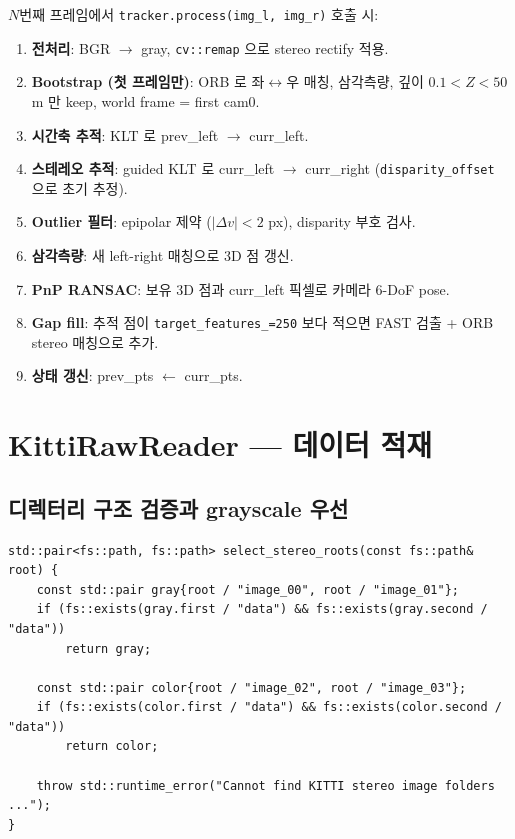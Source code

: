 \documentclass[11pt,a4paper,oneside]{report}
\begin{document}
\(N\)번째 프레임에서 \texttt{tracker.process(img\_l, img\_r)} 호출 시:

\begin{enumerate}
\item \textbf{전처리}: BGR \(\to\) gray, \texttt{cv::remap} 으로 stereo rectify 적용.
\item \textbf{Bootstrap (첫 프레임만)}: ORB 로 좌\(\leftrightarrow\)우 매칭, 삼각측량, 깊이 \(0.1 < Z < 50\) m 만 keep, world frame = first cam0.
\item \textbf{시간축 추적}: KLT 로 prev\_left \(\to\) curr\_left.
\item \textbf{스테레오 추적}: guided KLT 로 curr\_left \(\to\) curr\_right (\texttt{disparity\_offset} 으로 초기 추정).
\item \textbf{Outlier 필터}: epipolar 제약 (\(|\Delta v| < 2\) px), disparity 부호 검사.
\item \textbf{삼각측량}: 새 left-right 매칭으로 3D 점 갱신.
\item \textbf{PnP RANSAC}: 보유 3D 점과 curr\_left 픽셀로 카메라 6-DoF pose.
\item \textbf{Gap fill}: 추적 점이 \texttt{target\_features\_=250} 보다 적으면 FAST 검출 + ORB stereo 매칭으로 추가.
\item \textbf{상태 갱신}: prev\_pts \(\leftarrow\) curr\_pts.
\end{enumerate}

\section{KittiRawReader — 데이터 적재}

\subsection{디렉터리 구조 검증과 grayscale 우선}

\begin{lstlisting}[style=cpp,caption={\texttt{src/io/kitti\_raw\_reader.cpp:79-91}}]
std::pair<fs::path, fs::path> select_stereo_roots(const fs::path& root) {
    const std::pair gray{root / "image_00", root / "image_01"};
    if (fs::exists(gray.first / "data") && fs::exists(gray.second / "data"))
        return gray;

    const std::pair color{root / "image_02", root / "image_03"};
    if (fs::exists(color.first / "data") && fs::exists(color.second / "data"))
        return color;

    throw std::runtime_error("Cannot find KITTI stereo image folders ...");
}
\end{lstlisting}
\end{document}
